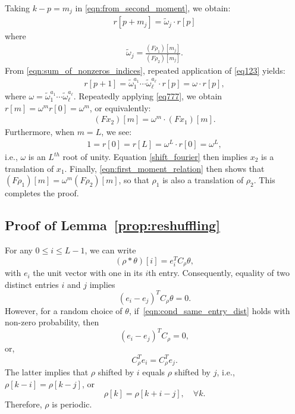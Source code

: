 \documentclass{IEEEtran}
\numberwithin{equation}{section}
\numberwithin{figure}{section}
\theoremstyle{plain}
\theoremstyle{definition}
\theoremstyle{remark}
\theoremstyle{plain}
\theoremstyle{remark}
\theoremstyle{plain}
\theoremstyle{plain}
\theoremstyle{remark}
\newcommand{\F}{F}
\begin{document}
Taking $k-p = m_j$ in \eqref{eqn:from_second_moment}, we obtain:
%
\begin{align}  \label{eq123}
%
    r[p+m_j] = \tilde{\omega}_j \cdot r [p]
%
\end{align}
%
where 
%
\begin{align*}
%
    \tilde{\omega}_j = \frac{(\F \rho_1) [m_j]}{(\F \rho_2) [m_j]}.
%
\end{align*}
%
From \eqref{eqn:sum_of_nonzeros_indices}, repeated application of \eqref{eq123} yields:
%
\begin{align} \label{eq777}
%
    r[p+1] = \tilde{\omega}_1^{a_1} \cdots \tilde{\omega}_\ell^{a_\ell} \cdot r[p]
         = \omega \cdot r[p],
%
\end{align}
%
where $\omega = \tilde{\omega}_1^{a_1} \cdots \tilde{\omega}_\ell^{a_\ell}$. Repeatedly applying \eqref{eq777}, we obtain $r[m] = \omega^m r[0] = \omega^m$, or equivalently:
%
\begin{align} \label{shift_fourier}
%
    (\F x_2)[m] = \omega^m \cdot (\F x_1)[m].
%
\end{align}
%
Furthermore, when $m = L$, we see:
%
\begin{align*}
%
    1 = r[0] = r[L]= \omega^L \cdot r[0] = \omega^L,
%
\end{align*}
i.e., $\omega$ is an $L^{th}$ root of unity. Equation \eqref{shift_fourier} then implies $x_2$ is a translation of $x_1$. Finally, \eqref{eqn:first_moment_relation} then shows that $(\F \rho_1)[m] = \omega^m (\F \rho_2)[m]$, so that $\rho_1$ is also a translation of $\rho_2$. This completes the proof.

\subsection{Proof of Lemma~\ref{prop:reshuffling}} \label{sec:proof_prop_reshuffling}

For any $0 \le i \le L-1$, we can write 
\[ (\rho \ast \theta)[i] = e_i^T C_\rho \theta , \]
with $e_i$ the unit vector with one in its $i$th entry. Consequently, equality of two distinct entries $i$ and $j$ implies 
\begin{equation} \label{eqn:cond_same_entry_dist}
(e_i - e_j)^T C_\rho \theta = 0. 
\end{equation}
However, for a random choice of $\theta$, if~\eqref{eqn:cond_same_entry_dist} holds with non-zero probability, then 
\[ (e_i - e_j)^T C_\rho = 0 , \]
or, 
\[C_\rho^T e_i = C_\rho^T e_j.\]
The latter implies that $\rho$ shifted by $i$ equals $\rho$ shifted by $j$, i.e., $\rho[k-i] = \rho[k-j]$, or 
\[ \rho[k] = \rho[k + i-j], \quad \forall k. \] 
Therefore, $\rho$ is periodic. 
\end{document}
